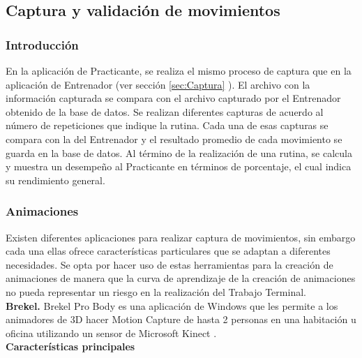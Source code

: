 \subsection{Captura y validación de movimientos}

\subsubsection{Introducción}
En la aplicación de Practicante, se realiza el mismo proceso de captura que en la aplicación de Entrenador (ver sección \ref{sec:Captura} ). El archivo con la información capturada se compara con el archivo capturado por el Entrenador obtenido de la base de datos. Se realizan diferentes capturas de acuerdo al número de repeticiones que indique la rutina. Cada una de esas capturas se compara con la del Entrenador y el resultado promedio de cada movimiento se guarda en la base de datos. Al término de la realización de una rutina, se calcula y muestra un desempeño al Practicante en términos de porcentaje, el cual indica su rendimiento general.\\

\subsubsection{Animaciones}
Existen diferentes aplicaciones para realizar captura de movimientos, sin embargo cada una ellas ofrece características particulares que se adaptan a diferentes necesidades. Se opta por hacer uso de estas herramientas para la creación de animaciones de manera que la curva de aprendizaje de la creación de animaciones no pueda representar un riesgo en la realización del Trabajo Terminal.\\

\textbf{Brekel.} Brekel Pro Body es una aplicación de Windows que les permite a los animadores de 3D hacer Motion Capture de hasta 2 personas en una habitación u oficina utilizando un sensor de Microsoft Kinect \cite{Brekel}. \\

\textbf{Características principales}


